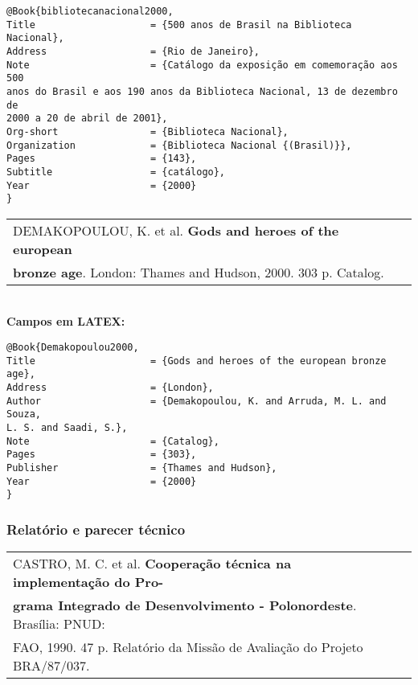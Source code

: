 \begingroup
\fontsize{10pt}{12pt}\selectfont
\begin{verbatim}
@Book{bibliotecanacional2000,
Title                    = {500 anos de Brasil na Biblioteca Nacional},
Address                  = {Rio de Janeiro},
Note                     = {Catálogo da exposição em comemoração aos 500
anos do Brasil e aos 190 anos da Biblioteca Nacional, 13 de dezembro de
2000 a 20 de abril de 2001},
Org-short                = {Biblioteca Nacional},
Organization             = {Biblioteca Nacional {(Brasil)}},
Pages                    = {143},
Subtitle                 = {catálogo},
Year                     = {2000}
}
\end{verbatim}
\endgroup
	
\begin{tabular}{|l|c|} \hline
	DEMAKOPOULOU, K. et al. \textbf{Gods and heroes of the european} \\ \textbf{bronze age}. London:  Thames and Hudson, 2000. 303 p. Catalog.    \\\hline
\end{tabular}\\
	
\textbf{Campos em LATEX:}
	
\begingroup
\fontsize{10pt}{12pt}\selectfont
\begin{verbatim}
@Book{Demakopoulou2000,
Title                    = {Gods and heroes of the european bronze age},
Address                  = {London},
Author                   = {Demakopoulou, K. and Arruda, M. L. and Souza,
L. S. and Saadi, S.},
Note                     = {Catalog},
Pages                    = {303},
Publisher                = {Thames and Hudson},
Year                     = {2000}
}
\end{verbatim}
\endgroup
\subsubsection{Relatório e parecer técnico}
	
\begin{tabular}{|l|c|} \hline
	CASTRO, M. C. et al. \textbf{Cooperação técnica na implementação do 
	Pro-}                                                                    \\\textbf{grama Integrado de Desenvolvimento - Polonordeste}. Brasília:
	PNUD:                                                                    \\FAO, 1990. 47 p. Relatório da Missão de Avaliação do Projeto
	BRA/87/037.                                                              \\\hline
\end{tabular}\\
	
